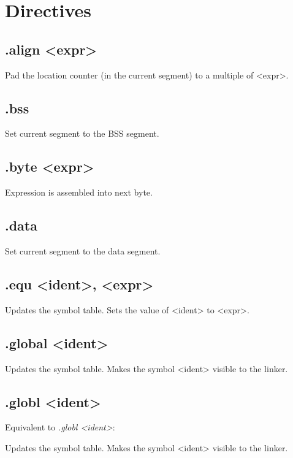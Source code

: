 \documentclass[
   a4paper,
   twoside,
   bringhurst,
   palatino,
   english,
   titlepage,
   fleqn
]{refman}
\begin{document}
    \chapter{Directives}

    \section{.align <expr>}

    Pad the location counter (in the current segment) to a multiple of
    <expr>.

    \section{.bss}

    Set current segment to the BSS segment.

    \section{.byte <expr>}

    Expression is assembled into next byte.

    \section{.data}

    Set current segment to the data segment.

    \section{.equ <ident>, <expr>}

    Updates the symbol table. Sets the value of <ident> to <expr>.

    \section{.global <ident>}

    Updates the symbol table. Makes the symbol <ident> visible to the linker.


    \section{.globl <ident>}

    Equivalent to \textit{.globl <ident>}:

    Updates the symbol table. Makes the symbol <ident> visible to the linker.
\end{document}
